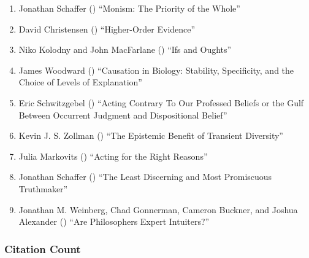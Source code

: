\documentclass[
  10pt,
  letterpaper,
  DIV=11,
  numbers=noendperiod,
  twoside]{scrartcl}
\providecommand{\tightlist}{%
  \setlength{\itemsep}{0pt}\setlength{\parskip}{0pt}}\usepackage{longtable,booktabs,array}
\begin{document}
\begin{enumerate}
\def\labelenumi{\arabic{enumi}.}
\tightlist
\item
  Jonathan Schaffer () ``Monism:
  The Priority of the Whole''
\item
  David Christensen ()
  ``Higher-Order Evidence''
\item
  Niko Kolodny and John MacFarlane
  () ``Ifs and Oughts''
\item
  James Woodward () ``Causation
  in Biology: Stability, Specificity, and the Choice of Levels of
  Explanation''
\item
  Eric Schwitzgebel () ``Acting
  Contrary To Our Professed Beliefs or the Gulf Between Occurrent
  Judgment and Dispositional Belief''
\item
  Kevin J. S. Zollman () ``The
  Epistemic Benefit of Transient Diversity''
\item
  Julia Markovits () ``Acting for
  the Right Reasons''
\item
  Jonathan Schaffer () ``The
  Least Discerning and Most Promiscuous Truthmaker''
\item
  Jonathan M. Weinberg, Chad Gonnerman, Cameron Buckner, and Joshua
  Alexander () ``Are Philosophers
  Expert Intuiters?''
\end{enumerate}

\subsubsection*{Citation Count}\label{sec-count-2010}
\end{document}

